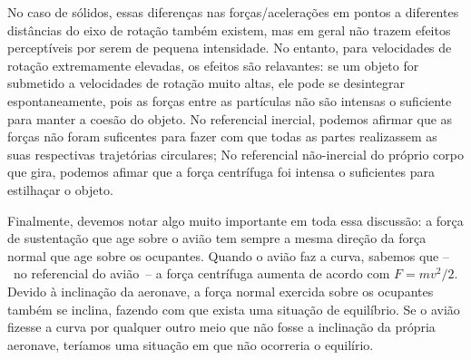 No caso de sólidos, essas diferenças nas forças/acelerações em pontos a diferentes distâncias do eixo de rotação também existem, mas em geral não trazem efeitos perceptíveis por serem de pequena intensidade. No entanto, para velocidades de rotação extremamente elevadas, os efeitos são relavantes: se um objeto for submetido a velocidades de rotação muito altas, ele pode se desintegrar espontaneamente, pois as forças entre as partículas não são intensas o suficiente para manter a coesão do objeto. No referencial inercial, podemos afirmar que as forças não foram suficentes para fazer com que todas as partes realizassem as suas respectivas trajetórias circulares; No referencial não-inercial do próprio corpo que gira, podemos afimar que a força centrífuga foi intensa o suficientes para estilhaçar o objeto.

Finalmente, devemos notar algo muito importante em toda essa discussão: a força de sustentação que age sobre o avião tem sempre a mesma direção da força normal que age sobre os ocupantes. Quando o avião faz a curva, sabemos que --~no referencial do avião~-- a força centrífuga aumenta de acordo com $F = mv^2/2$. Devido à inclinação da aeronave, a força normal exercida sobre os ocupantes também se inclina, fazendo com que exista uma situação de equilíbrio. Se o avião fizesse a curva por qualquer outro meio que não fosse a inclinação da própria aeronave, teríamos uma situação em que não ocorreria o equilírio.






